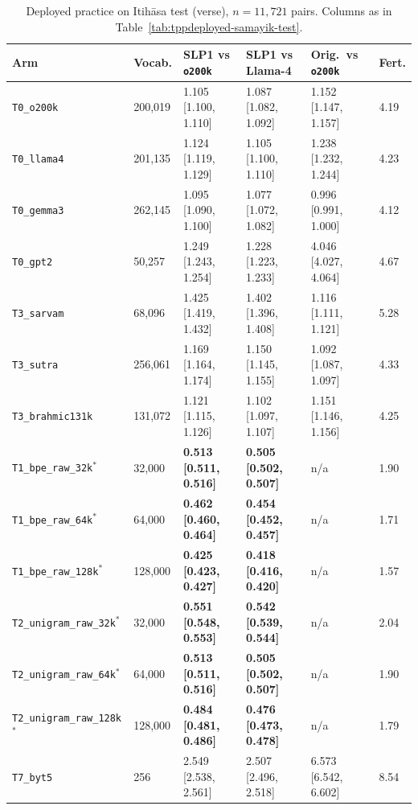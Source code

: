 \begin{table}[t]
\centering
\scriptsize
\begin{tabular}{llllll}
\toprule
Arm & Vocab. & SLP1 vs \texttt{o200k} & SLP1 vs Llama-4 & Orig.\ vs \texttt{o200k} & Fert. \\
\midrule
\texttt{T0\_o200k} & 200,019 & 1.105 [1.100, 1.110] & 1.087 [1.082, 1.092] & 1.152 [1.147, 1.157] & 4.19 \\
\texttt{T0\_llama4} & 201,135 & 1.124 [1.119, 1.129] & 1.105 [1.100, 1.110] & 1.238 [1.232, 1.244] & 4.23 \\
\texttt{T0\_gemma3} & 262,145 & 1.095 [1.090, 1.100] & 1.077 [1.072, 1.082] & 0.996 [0.991, 1.000] & 4.12 \\
\texttt{T0\_gpt2} & 50,257 & 1.249 [1.243, 1.254] & 1.228 [1.223, 1.233] & 4.046 [4.027, 4.064] & 4.67 \\
\texttt{T3\_sarvam} & 68,096 & 1.425 [1.419, 1.432] & 1.402 [1.396, 1.408] & 1.116 [1.111, 1.121] & 5.28 \\
\texttt{T3\_sutra} & 256,061 & 1.169 [1.164, 1.174] & 1.150 [1.145, 1.155] & 1.092 [1.087, 1.097] & 4.33 \\
\texttt{T3\_brahmic131k} & 131,072 & 1.121 [1.115, 1.126] & 1.102 [1.097, 1.107] & 1.151 [1.146, 1.156] & 4.25 \\
\texttt{T1\_bpe\_raw\_32k}$^{*}$ & 32,000 & \textbf{0.513 [0.511, 0.516]} & \textbf{0.505 [0.502, 0.507]} & n/a & 1.90 \\
\texttt{T1\_bpe\_raw\_64k}$^{*}$ & 64,000 & \textbf{0.462 [0.460, 0.464]} & \textbf{0.454 [0.452, 0.457]} & n/a & 1.71 \\
\texttt{T1\_bpe\_raw\_128k}$^{*}$ & 128,000 & \textbf{0.425 [0.423, 0.427]} & \textbf{0.418 [0.416, 0.420]} & n/a & 1.57 \\
\texttt{T2\_unigram\_raw\_32k}$^{*}$ & 32,000 & \textbf{0.551 [0.548, 0.553]} & \textbf{0.542 [0.539, 0.544]} & n/a & 2.04 \\
\texttt{T2\_unigram\_raw\_64k}$^{*}$ & 64,000 & \textbf{0.513 [0.511, 0.516]} & \textbf{0.505 [0.502, 0.507]} & n/a & 1.90 \\
\texttt{T2\_unigram\_raw\_128k}$^{*}$ & 128,000 & \textbf{0.484 [0.481, 0.486]} & \textbf{0.476 [0.473, 0.478]} & n/a & 1.79 \\
\texttt{T7\_byt5} & 256 & 2.549 [2.538, 2.561] & 2.507 [2.496, 2.518] & 6.573 [6.542, 6.602] & 8.54 \\
\bottomrule
\end{tabular}
\caption{Deployed practice on Itih\=asa test (verse), $n=11{,}721$ pairs. Columns as in Table~\ref{tab:tppdeployed-samayik-test}.}
\label{tab:tppdeployed-itihasa-test}
\end{table}

